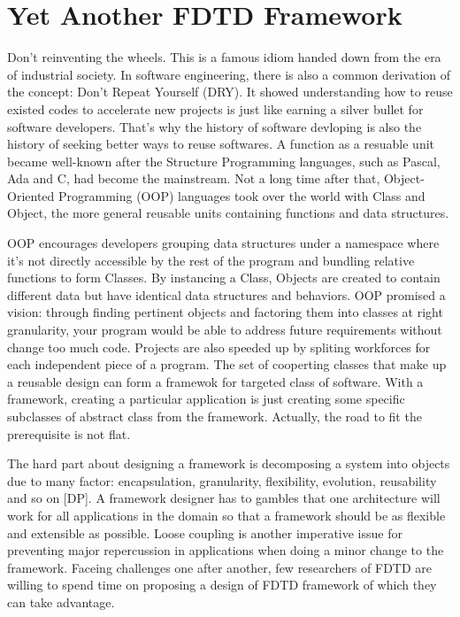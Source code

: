 \section{Yet Another FDTD Framework}

Don't reinventing the wheels. This is a famous idiom handed down from the era of industrial society. In software
engineering, there is also a common derivation of the concept: Don't Repeat Yourself (DRY). It showed understanding how
to reuse existed codes to accelerate new projects is just like earning a silver bullet for software developers. That's
why the history of software devloping is also the history of seeking better ways to reuse softwares. A function as a
resuable unit became well-known after the Structure Programming languages, such as Pascal, Ada and C, had become the
mainstream. Not a long time after that, Object-Oriented Programming (OOP) languages took over the world with Class and
Object, the more general reusable units containing functions and data structures.

OOP encourages developers grouping data structures under a namespace where it's not directly accessible by the rest of
the program and bundling relative functions to form Classes. By instancing a Class, Objects are created to contain
different data but have identical data structures and behaviors. OOP promised a vision: through finding pertinent
objects and factoring them into classes at right granularity, your program would be able to address future requirements
without change too much code. Projects are also speeded up by spliting workforces for each independent piece of a
program. The set of cooperting classes that make up a reusable design can form a framewok for targeted class of
software. With a framework, creating a particular application is just creating some specific subclasses of abstract
class from the framework. Actually, the road to fit the prerequisite is not flat.

The hard part about designing a framework is decomposing a system into objects due to many factor: encapsulation,
granularity, flexibility, evolution, reusability and so on [DP]. A framework designer has to gambles that one
architecture will work for all applications in the domain so that a framework should be as flexible and extensible as
possible. Loose coupling is another imperative issue for preventing major repercussion in applications when doing a
minor change to the framework. Faceing challenges one after another, few researchers of FDTD are willing to spend time
on proposing a design of FDTD framework of which they can take advantage.


